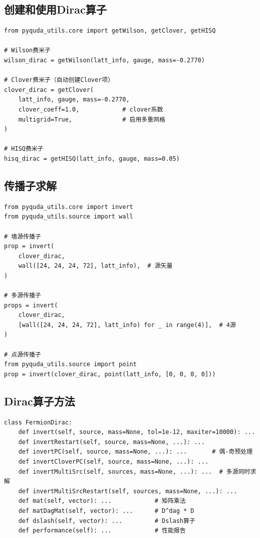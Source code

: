 \documentclass[12pt,a4paper]{ctexart}
\begin{document}
\subsection{创建和使用Dirac算子}

\begin{lstlisting}[caption={Dirac算子使用示例}, label={lst:dirac}]
from pyquda_utils.core import getWilson, getClover, getHISQ

# Wilson费米子
wilson_dirac = getWilson(latt_info, gauge, mass=-0.2770)

# Clover费米子（自动创建Clover项）
clover_dirac = getClover(
    latt_info, gauge, mass=-0.2770,
    clover_coeff=1.0,            # clover系数
    multigrid=True,              # 启用多重网格
)

# HISQ费米子
hisq_dirac = getHISQ(latt_info, gauge, mass=0.05)
\end{lstlisting}

\subsection{传播子求解}

\begin{lstlisting}[caption={夸克传播子求解}, label={lst:invert}]
from pyquda_utils.core import invert
from pyquda_utils.source import wall

# 墙源传播子
prop = invert(
    clover_dirac,
    wall([24, 24, 24, 72], latt_info),  # 源矢量
)

# 多源传播子
props = invert(
    clover_dirac,
    [wall([24, 24, 24, 72], latt_info) for _ in range(4)],  # 4源
)

# 点源传播子
from pyquda_utils.source import point
prop = invert(clover_dirac, point(latt_info, [0, 0, 0, 0]))
\end{lstlisting}

\subsection{Dirac算子方法}

\begin{lstlisting}[caption={FermionDirac 关键方法}]
class FermionDirac:
    def invert(self, source, mass=None, tol=1e-12, maxiter=10000): ...
    def invertRestart(self, source, mass=None, ...): ...
    def invertPC(self, source, mass=None, ...): ...       # 偶-奇预处理
    def invertCloverPC(self, source, mass=None, ...): ...
    def invertMultiSrc(self, sources, mass=None, ...): ...  # 多源同时求解
    def invertMultiSrcRestart(self, sources, mass=None, ...): ...
    def mat(self, vector): ...            # 矩阵乘法
    def matDagMat(self, vector): ...      # D^dag * D
    def dslash(self, vector): ...         # Dslash算子
    def performance(self): ...            # 性能报告
\end{lstlisting}
\end{document}
